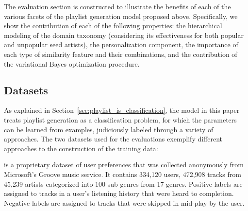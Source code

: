 The evaluation section is constructed to illustrate the benefits of each of the various facets of the playlist generation model proposed above. Specifically, we show  the contribution of each of the following properties: the hierarchical modeling of the domain taxonomy (considering its effectiveness for both popular and unpopular seed artists), the personalization component, the importance of each type of similarity feature and their combinations, and the contribution of the variational Bayes optimization procedure. 

\subsection{Datasets}
As explained in Section~\ref{sec:playlist_is_classification}, the model in this paper treats playlist generation
as a classification problem, for which the parameters can be
learned from examples, judiciously labeled through a variety of approaches.
The  two datasets  used for the evaluations exemplify different approaches to the construction of the training data:

is a proprietary dataset of user preferences that was collected anonymously from Microsoft's Groove music service.
It contains 334,120 users, 472,908 tracks from 45,239 artists categorized into 100 sub-genres from 17 genres. Positive labels
are assigned to tracks in a user's listening history that were heard to completion. Negative labels are assigned to tracks that were skipped in mid-play by the user.

